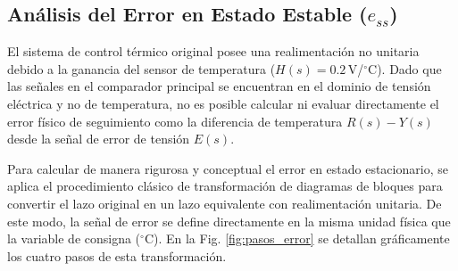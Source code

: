 \documentclass[journal,twocolumn]{IEEEtran}
\begin{document}
\subsection{Análisis del Error en Estado Estable \texorpdfstring{($e_{ss}$)}{e\_ss}}

El sistema de control térmico original posee una realimentación no unitaria debido a la ganancia del sensor de temperatura ($H(s) = 0.2$\,V/$^\circ$C). Dado que las señales en el comparador principal se encuentran en el dominio de tensión eléctrica y no de temperatura, no es posible calcular ni evaluar directamente el error físico de seguimiento como la diferencia de temperatura $R(s) - Y(s)$ desde la señal de error de tensión $E(s)$.

Para calcular de manera rigurosa y conceptual el error en estado estacionario, se aplica el procedimiento clásico de transformación de diagramas de bloques para convertir el lazo original en un lazo equivalente con realimentación unitaria. De este modo, la señal de error se define directamente en la misma unidad física que la variable de consigna ($^\circ$C). En la Fig. \ref{fig:pasos_error} se detallan gráficamente los cuatro pasos de esta transformación.
\end{document}
